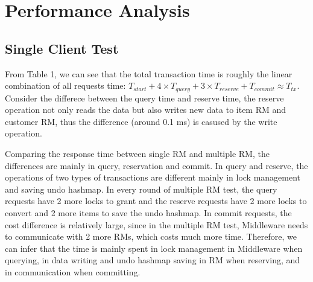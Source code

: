 \documentclass[a4paper, 11pt]{article}
\begin{document}
\section{Performance Analysis}
\vspace{-10pt}
\subsection{Single Client Test}
\vspace{-10pt}
      From Table 1, we can see that the total transaction time is roughly the linear combination of all requests time: $T_{start} + 4\times T_{query} + 3\times T_{reserve} + T_{commit}\approx T_{tx}$. Consider the differece between the query time and reserve time, the reserve operation not only reads the data but also writes new data to item RM and customer RM, thus the difference (around 0.1 ms) is casused by the write operation. \par
      Comparing the response time between single RM and multiple RM, the differences are mainly in query, reservation and commit. In query and reserve, the operations of two types of transactions are different mainly in lock management and saving undo hashmap. In every round of multiple RM test, the query requests have 2 more locks to grant and the reserve requests have 2 more locks to convert and 2 more items to save the undo hashmap. In commit requests, the cost difference is relatively large, since in the multiple RM test, Middleware needs to communicate with 2 more RMs, which costs much more time. Therefore, we can infer that the time is mainly spent in lock management in Middleware when querying, in data writing and undo hashmap saving in RM when reserving, and in communication when committing.
\vspace{-15pt}
\end{document}
